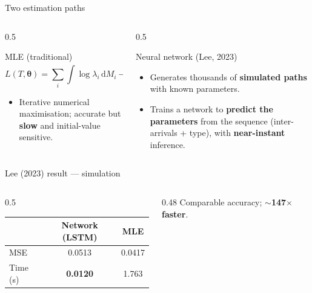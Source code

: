 \documentclass[aspectratio=169]{beamer}
\begin{document}
\begin{frame}{Two estimation paths}
  \begin{columns}[T]
    \begin{column}{0.5\textwidth}
      \begin{block}{MLE (traditional)}
        \[
          L(T,\boldsymbol\theta)=\sum_{i}\!\int \log\lambda_i\,\mathrm{d}M_i-\!\int_0^T\!\lambda_i\,\mathrm{d}u
        \]
        \begin{itemize}\footnotesize
          \item Iterative numerical maximisation; accurate but \textbf{slow} and initial-value sensitive.
        \end{itemize}
      \end{block}
    \end{column}
    \begin{column}{0.5\textwidth}
      \begin{block}{Neural network (Lee, 2023)}
        \begin{itemize}\footnotesize
          \item Generates thousands of \textbf{simulated paths} with known parameters.
          \item Trains a network to \textbf{predict the parameters} from the sequence (inter-arrivals + type), with \textbf{near-instant} inference.
        \end{itemize}
      \end{block}
    \end{column}
  \end{columns}
  \begin{block}{Lee (2023) result — simulation}
    \scriptsize
    \begin{columns}[c]
      \begin{column}{0.5\textwidth}
        \centering
        \begin{tabular}{lcc}
          \toprule
          & \textbf{Network (LSTM)} & \textbf{MLE} \\
          \midrule
          MSE        & 0.0513 & 0.0417 \\
          Time (s)   & \textbf{0.0120} & 1.763 \\
          \bottomrule
        \end{tabular}
      \end{column}
      \begin{column}{0.48\textwidth}
        Comparable accuracy; \textbf{$\sim$147$\times$ faster}.
      \end{column}
    \end{columns}
  \end{block}
\end{frame}
\end{document}
